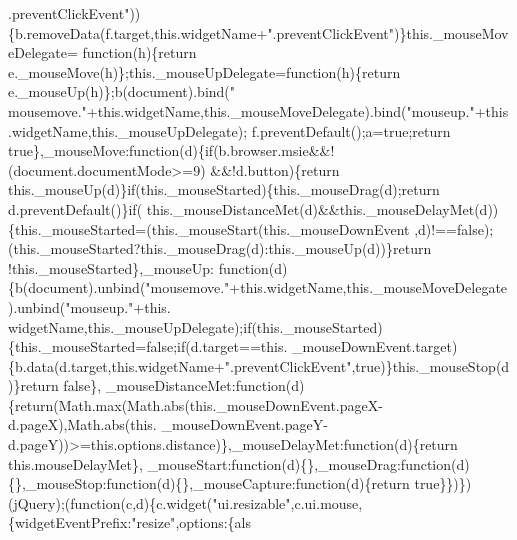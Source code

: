 \begin{DoxyCode}
{      .preventClickEvent"}))\{b.removeData(f.target,\textcolor{keyword}{this}.widgetName+\textcolor{stringliteral}{".preventClickEvent"})\}this.\_mouseMoveDelegate=\textcolor{keyword}{
      function}(h)\{\textcolor{keywordflow}{return} e.\_mouseMove(h)\};this.\_mouseUpDelegate=\textcolor{keyword}{function}(h)\{\textcolor{keywordflow}{return} e.\_mouseUp(h)\};b(document).bind(\textcolor{stringliteral}{"
      mousemove."}+this.widgetName,this.\_mouseMoveDelegate).bind(\textcolor{stringliteral}{"mouseup."}+this.widgetName,this.\_mouseUpDelegate);
      f.preventDefault();a=\textcolor{keyword}{true};\textcolor{keywordflow}{return} \textcolor{keyword}{true}\},\_mouseMove:\textcolor{keyword}{function}(d)\{\textcolor{keywordflow}{if}(b.browser.msie&&!(document.documentMode>=9)
      &&!d.button)\{\textcolor{keywordflow}{return} this.\_mouseUp(d)\}\textcolor{keywordflow}{if}(this.\_mouseStarted)\{this.\_mouseDrag(d);\textcolor{keywordflow}{return} d.preventDefault()\}\textcolor{keywordflow}{if}(
      this.\_mouseDistanceMet(d)&&this.\_mouseDelayMet(d))\{this.\_mouseStarted=(this.\_mouseStart(this.\_mouseDownEvent
      ,d)!==\textcolor{keyword}{false});(this.\_mouseStarted?this.\_mouseDrag(d):this.\_mouseUp(d))\}return !this.\_mouseStarted\},\_mouseUp:
      function(d)\{b(document).unbind(\textcolor{stringliteral}{"mousemove."}+this.widgetName,this.\_mouseMoveDelegate).unbind(\textcolor{stringliteral}{"mouseup."}+this.
      widgetName,this.\_mouseUpDelegate);\textcolor{keywordflow}{if}(this.\_mouseStarted)\{this.\_mouseStarted=\textcolor{keyword}{false};\textcolor{keywordflow}{if}(d.target==\textcolor{keyword}{this}.
      \_mouseDownEvent.target)\{b.data(d.target,\textcolor{keyword}{this}.widgetName+\textcolor{stringliteral}{".preventClickEvent"},\textcolor{keyword}{true})\}this.\_mouseStop(d)\}\textcolor{keywordflow}{return} \textcolor{keyword}{false}\},
      \_mouseDistanceMet:\textcolor{keyword}{function}(d)\{\textcolor{keywordflow}{return}(Math.max(Math.abs(\textcolor{keyword}{this}.\_mouseDownEvent.pageX-d.pageX),Math.abs(this.
      \_mouseDownEvent.pageY-d.pageY))>=this.options.distance)\},\_mouseDelayMet:\textcolor{keyword}{function}(d)\{\textcolor{keywordflow}{return} this.mouseDelayMet\},
      \_mouseStart:\textcolor{keyword}{function}(d)\{\},\_mouseDrag:\textcolor{keyword}{function}(d)\{\},\_mouseStop:\textcolor{keyword}{function}(d)\{\},\_mouseCapture:\textcolor{keyword}{function}(d)\{\textcolor{keywordflow}{return} \textcolor{keyword}{
      true}\}\})\})(jQuery);(\textcolor{keyword}{function}(c,d)\{c.widget(\textcolor{stringliteral}{"ui.resizable"},c.ui.mouse,\{widgetEventPrefix:\textcolor{stringliteral}{"resize"},options:\{als

\end{DoxyCode}
